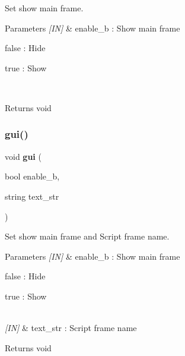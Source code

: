 Set show main frame. 


\begin{DoxyCode}{0}
\end{DoxyCode}



\begin{DoxyParams}{Parameters}
{\em \mbox{[}\+I\+N\mbox{]}} & enable\+\_\+b \+: Show main frame \begin{DoxyItemize}
\item false \+: Hide \item true \+: Show \end{DoxyItemize}
\\
\hline
\end{DoxyParams}
\begin{DoxyReturn}{Returns}
void 
\end{DoxyReturn}
\mbox{\label{group___system__object_ga97de3102fb3fe0fa9f03934f0c309d50}} 
\subsubsection{gui()\hspace{0.1cm}{\footnotesize\ttfamily [2/3]}}
{\footnotesize\ttfamily void \textbf{ gui} (\begin{DoxyParamCaption}\item[{bool}]{enable\+\_\+b,  }\item[{string}]{text\+\_\+str }\end{DoxyParamCaption})}



Set show main frame and Script frame name. 


\begin{DoxyCode}{0}
\end{DoxyCode}



\begin{DoxyParams}{Parameters}
{\em \mbox{[}\+I\+N\mbox{]}} & enable\+\_\+b \+: Show main frame \begin{DoxyItemize}
\item false \+: Hide \item true \+: Show \end{DoxyItemize}
\\
\hline
{\em \mbox{[}\+I\+N\mbox{]}} & text\+\_\+str \+: Script frame name \\
\hline
\end{DoxyParams}
\begin{DoxyReturn}{Returns}
void 
\end{DoxyReturn}
\mbox{\label{group___system__object_ga49d7159272e32e090c26c338021acbf1}} 
